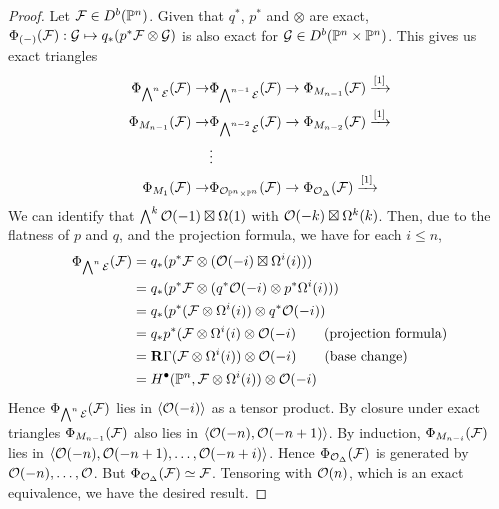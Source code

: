 \begin{proof}
    Let $\mathcal{F}\in D^b(\mathbb{P}^n)$. Given that $q^*$, $p^*$ and $\otimes$ are exact, $\Phi_{(-)}(\mathcal{F}):\mathcal{G}\mapsto q_{*}(p^{*}\mathcal{F}\otimes\mathcal{G})$ is also exact for $\mathcal{G} \in D^b(\mathbb{P}^n\times \mathbb{P}^n)$. This gives us exact triangles
    \begin{align*}
        \Phi_{\bigwedge^{n}\mathcal{E}}(\mathcal{F}) \to &\Phi_{\bigwedge^{n-1}\mathcal{E}} (\mathcal{F})\to \Phi_{M_{n-1}}(\mathcal{F})\xrightarrow{[1]}   \\
        \Phi_{M_{n-1}}(\mathcal{F})\to & \Phi_{\bigwedge^{n-2}\mathcal{E}} (\mathcal{F})\to \Phi_{M_{n-2}}(\mathcal{F})\xrightarrow{[1]}  \\
        &\vdots \\
        \Phi_{M_{1}}(\mathcal{F})\to &\Phi_{\mathcal{O}_{\mathbb{P}^n\times\mathbb{P}^n} }(\mathcal{F})\to \Phi_{\mathcal{O}_{\Delta}} (\mathcal{F})\xrightarrow{[1]}
    \end{align*}
    We can identify that $\bigwedge^{k}\mathcal{O}(-1)\boxtimes\Omega(1)$ with $\mathcal{O}(-k)\boxtimes\Omega^k(k)$. Then, due to the flatness of $p$ and $q$, and the projection formula, we have for each $i \leq n$,
    \begin{align*}
        \Phi_{\bigwedge^n\mathcal{E}}(\mathcal{F})
            &= q_*(p^*\mathcal{F}\otimes(\mathcal{O}(-i)\boxtimes\Omega^i(i))) \\
            &= q_*(p^*\mathcal{F}\otimes(q^*\mathcal{O}(-i)\otimes p^*\Omega^i(i))) \\
            &= q_*(p^*(\mathcal{F}\otimes\Omega^i(i))\otimes q^*\mathcal{O}(-i)) \\
            &= q_*p^*(\mathcal{F}\otimes\Omega^i(i)\otimes\mathcal{O}(-i)
                \qquad \text{(projection formula)} \\
            &= \operatorname{\mathbf{R}\Gamma}(\mathcal{F}\otimes\Omega^i(i))\otimes\mathcal{O}(-i)
                \qquad \text{(base change)} \\
            &= H^\bullet(\mathbb{P}^n,\mathcal{F}\otimes\Omega^i(i))\otimes\mathcal{O}(-i)
    \end{align*}
    Hence $\Phi_{\bigwedge^{n}\mathcal{E}} (\mathcal{F})$ lies in $\langle\mathcal{O}(-i)\rangle$ as a tensor product. By closure under exact triangles $\Phi_{M_{n-1}}(\mathcal{F})$ also lies in $\langle\mathcal{O}(-n),\mathcal{O}(-n+1)\rangle$. By induction, $\Phi_{M_{n-i}}(\mathcal{F})$ lies in $\langle\mathcal{O}(-n),\mathcal{O}(-n+1),\dots,\mathcal{O}(-n+i)\rangle$. Hence $\Phi_{\mathcal{O}_\Delta}(\mathcal{F})$ is generated by $\mathcal{O}(-n),\dots,\mathcal{O}$. But $\Phi_{\mathcal{O}_\Delta}(\mathcal{F})\simeq\mathcal{F}$. Tensoring with $\mathcal{O}(n)$, which is an exact equivalence, we have the desired result.
\end{proof}


